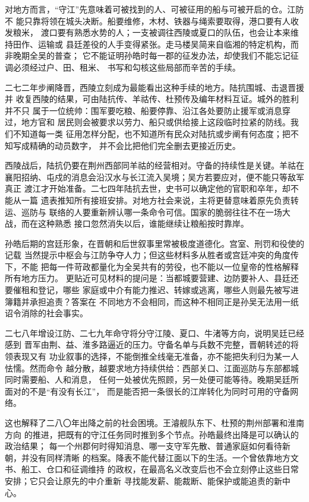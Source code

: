 对地方而言，“守江”先意味着可被找到的人、可被征用的船与可被开启的仓。江防不
能只靠将领在城头决断。船要维修，木材、铁器与绳索要取得，港口要有人收发粮米，
渡口要有熟悉水势的人；一支被调往西陵或夏口的队伍，也会让本来维持田作、运输或
县廷差役的人手变得紧张。走马楼吴简来自临湘的特定机构，而非晚期全吴的普查；
它不能证明孙皓时每一郡的征发办法，却使我们不能忘记征调必须经过户、田、租米、
书写和勾核这些局部而辛苦的手续。

二七二年步阐降晋，西陵立刻成为最能看出这种手续的地方。陆抗围城、击退晋援并
收复西陵的结果，可由陆抗传、羊祜传、杜预传及编年材料互证。城外的胜利并不只
属于一位统帅：围军要吃粮、船要停靠、沿江各处要防止援军或消息穿过，地方官和
居民则会被要求以劳力、船只或供给接上这段临时拉紧的防线。我们不知道每一类
征用怎样分配，也不知道所有民众对陆抗或步阐有何态度；把不知写成精确的动员数字，
并不会比把他们完全删去更接近历史。

西陵战后，陆抗仍要在荆州西部同羊祜的经营相对。守备的持续性是关键。羊祜在
襄阳招纳、屯戍的消息会沿汉水与长江流入吴境；吴方若要应对，便不能只等敌军真正
渡江才开始准备。二七四年陆抗去世，史书可以确定他的官职和卒年，却不能从一篇
遗表推知所有接班安排。对地方社会来说，主将更替意味着原先负责转运、巡防与
联络的人要重新辨认哪一条命令可信。国家的脆弱往往不在一场大战，而在这种熟悉
接口忽然消失以后，谁能继续让粮船按时靠岸。

孙皓后期的宫廷形象，在晋朝和后世叙事里常被极度道德化。宫室、刑罚和役使的记载
当然提示中枢会与江防争夺人力；但这些材料多从胜者或宫廷冲突的角度传下，不能
把每一件苛政都量化为全吴共有的劳役，也不能以一位皇帝的性格解释所有地方压力。
更贴近可见材料的提问是：当都城要营建、边防要补人、县廷还要催租和登记，哪些
家庭或中介有能力推迟、转嫁或逃离，哪些人则最先被写进簿籍并承担追责？答案在
不同地方不会相同，而这种不相同正是孙吴无法用一纸诏令消除的社会事实。

二七八年增设江防、二七九年命守将分守江陵、夏口、牛渚等方向，说明吴廷已经感到
晋军由荆、益、淮多路逼近的压力。守备名单与兵数不完整，晋朝转述的将领表现又有
功业叙事的选择，不能倒推全线毫无准备，亦不能把失利归为某一人怯懦。然而命令
越分散，越要求地方持续供给：西部关口、江面巡防与东部都城同时需要船、人和消息，
任何一处被优先照顾，另一处便可能等待。晚期吴廷所面对的不是“有没有长江”，
而是能否把一条很长的江岸转化为同时可用的守备网络。

这也解释了二八〇年出降之前的社会困境。王濬舰队东下、杜预的荆州部署和淮南方向
的推进，把既有的守江任务同时推到多个节点。孙皓最终出降是可以确认的政治结果；
每一个州郡何时得知消息、哪一支守军先散、普通家庭如何看待新朝，并没有同样清晰
的档案。降表不能代替江面以下的生活。一个曾依靠地方文书、船工、仓口和征调维持
的政权，在最高名义改变后也不会立刻停止这些日常安排；它只会让原先的中介重新
寻找能发薪、能裁断、能保护或能追责的新中心。

